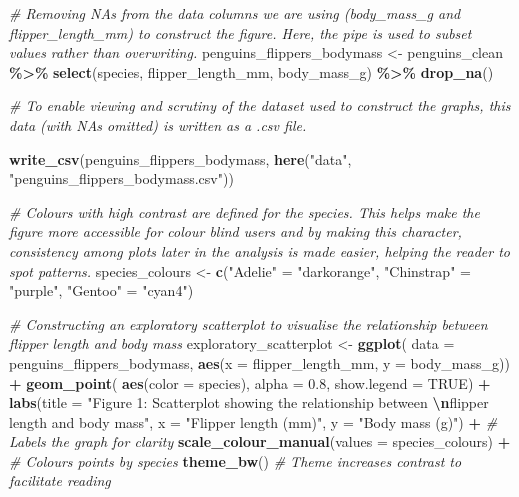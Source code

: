 \documentclass[
]{article}
\newenvironment{Shaded}{\begin{snugshade}}{\end{snugshade}}
\newcommand{\AttributeTok}[1]{\textcolor[rgb]{0.13,0.29,0.53}{#1}}
\newcommand{\CommentTok}[1]{\textcolor[rgb]{0.56,0.35,0.01}{\textit{#1}}}
\newcommand{\ConstantTok}[1]{\textcolor[rgb]{0.56,0.35,0.01}{#1}}
\newcommand{\FloatTok}[1]{\textcolor[rgb]{0.00,0.00,0.81}{#1}}
\newcommand{\FunctionTok}[1]{\textcolor[rgb]{0.13,0.29,0.53}{\textbf{#1}}}
\newcommand{\NormalTok}[1]{#1}
\newcommand{\OtherTok}[1]{\textcolor[rgb]{0.56,0.35,0.01}{#1}}
\newcommand{\SpecialCharTok}[1]{\textcolor[rgb]{0.81,0.36,0.00}{\textbf{#1}}}
\newcommand{\StringTok}[1]{\textcolor[rgb]{0.31,0.60,0.02}{#1}}
\begin{document}
\begin{Shaded}
\begin{Highlighting}[]
\CommentTok{\# Removing NAs from the data columns we are using (body\_mass\_g and flipper\_length\_mm) to construct the figure. Here, the pipe is used to subset values rather than overwriting.}
\NormalTok{penguins\_flippers\_bodymass }\OtherTok{\textless{}{-}}\NormalTok{ penguins\_clean }\SpecialCharTok{\%\textgreater{}\%}
  \FunctionTok{select}\NormalTok{(species, flipper\_length\_mm, body\_mass\_g) }\SpecialCharTok{\%\textgreater{}\%}
  \FunctionTok{drop\_na}\NormalTok{()}

\CommentTok{\# To enable viewing and scrutiny of the dataset used to construct the graphs, this data (with NAs omitted) is written as a .csv file.}

\FunctionTok{write\_csv}\NormalTok{(penguins\_flippers\_bodymass, }
          \FunctionTok{here}\NormalTok{(}\StringTok{"data"}\NormalTok{, }\StringTok{"penguins\_flippers\_bodymass.csv"}\NormalTok{))}

\CommentTok{\# Colours with high contrast are defined for the species. This helps make the figure more accessible for colour blind users and by making this character, consistency among plots later in the analysis is made easier, helping the reader to spot patterns.}
\NormalTok{species\_colours }\OtherTok{\textless{}{-}} \FunctionTok{c}\NormalTok{(}\StringTok{"Adelie"} \OtherTok{=} \StringTok{"darkorange"}\NormalTok{, }
                    \StringTok{"Chinstrap"} \OtherTok{=} \StringTok{"purple"}\NormalTok{, }
                    \StringTok{"Gentoo"} \OtherTok{=} \StringTok{"cyan4"}\NormalTok{)}

\CommentTok{\# Constructing an exploratory scatterplot to visualise the relationship between flipper length and body mass}
\NormalTok{exploratory\_scatterplot }\OtherTok{\textless{}{-}} \FunctionTok{ggplot}\NormalTok{(}
  \AttributeTok{data =}\NormalTok{ penguins\_flippers\_bodymass, }
  \FunctionTok{aes}\NormalTok{(}\AttributeTok{x =}\NormalTok{ flipper\_length\_mm, }
      \AttributeTok{y =}\NormalTok{ body\_mass\_g)) }\SpecialCharTok{+}
  \FunctionTok{geom\_point}\NormalTok{(}
    \FunctionTok{aes}\NormalTok{(}\AttributeTok{color =}\NormalTok{ species),}
    \AttributeTok{alpha =} \FloatTok{0.8}\NormalTok{,}
    \AttributeTok{show.legend =} \ConstantTok{TRUE}\NormalTok{) }\SpecialCharTok{+} 
  \FunctionTok{labs}\NormalTok{(}\AttributeTok{title =} 
         \StringTok{"Figure 1: Scatterplot showing the relationship between }\SpecialCharTok{\textbackslash{}n}\StringTok{flipper length and body mass"}\NormalTok{,}
       \AttributeTok{x =} \StringTok{"Flipper length (mm)"}\NormalTok{,}
       \AttributeTok{y =} \StringTok{"Body mass (g)"}\NormalTok{) }\SpecialCharTok{+} \CommentTok{\# Labels the graph for clarity}
  \FunctionTok{scale\_colour\_manual}\NormalTok{(}\AttributeTok{values =}\NormalTok{ species\_colours) }\SpecialCharTok{+} \CommentTok{\# Colours points by species}
  \FunctionTok{theme\_bw}\NormalTok{() }\CommentTok{\# Theme increases contrast to facilitate reading}


\end{Highlighting}
\end{Shaded}
\end{document}
